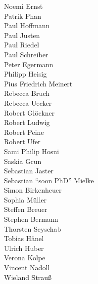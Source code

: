 \begin{minipage}[t][\textheight][b]{.01\textwidth}
{\begin{minipage}[b][\textheight][b]{13em}
Noemi Ernst\\
Patrik Phan\\
Paul Hoffmann\\
Paul Justen\\
Paul Riedel\\
Paul Schreiber\\
Peter Egermann\\
Philipp Heisig\\
Pius Friedrich Meinert\\
Rebecca Bruch\\
Rebecca Uecker\\
Robert Glöckner\\
Robert Ludwig\\
Robert Peine\\
Robert Ufer\\
Sami Philip Hosni\\
Saskia Grun\\
Sebastian Jaster\\
Sebastian ``soon PhD'' Mielke\\
Simon Birkenheuer\\
Sophia Müller\\
Steffen Breuer\\
Stephen Bermann\\
Thorsten Seyschab\\
Tobias Hänel\\
Ulrich Huber\\
Verona Kolpe\\
Vincent Nadoll\\
Wieland Strauß
\end{minipage}
}
\end{minipage}

\enlargethispage{2\baselineskip}

